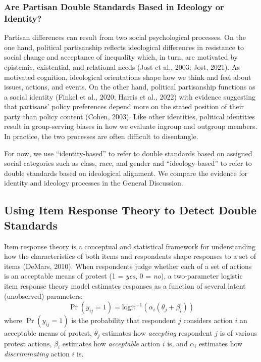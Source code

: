 \documentclass[12pt, letterpaper]{article}
\begin{document}
\hypertarget{are-partisan-double-standards-based-in-ideology-or-identity}{%
\subsubsection{Are Partisan Double Standards Based in Ideology or
Identity?}\label{are-partisan-double-standards-based-in-ideology-or-identity}}

Partisan differences can result from two social psychological processes.
On the one hand, political partisanship reflects ideological differences
in resistance to social change and acceptance of inequality which, in
turn, are motivated by epistemic, existential, and relational needs
(Jost et al., 2003; Jost, 2021). As motivated cognition, ideological
orientations shape how we think and feel about issues, actions, and
events. On the other hand, political partisanship functions as a social
identity (Finkel et al., 2020; Harris et al., 2022) with evidence
suggesting that partisans' policy preferences depend more on the stated
position of their party than policy content (Cohen, 2003). Like other
identities, political identities result in group-serving biases in how
we evaluate ingroup and outgroup members. In practice, the two processes
are often difficult to disentangle.

For now, we use ``identity-based'' to refer to double standards based on
assigned social categories such as class, race, and gender and
``ideology-based'' to refer to double standards based on ideological
alignment. We compare the evidence for identity and ideology processes
in the General Discussion.

\hypertarget{using-item-response-theory-to-detect-double-standards}{%
\subsection{Using Item Response Theory to Detect Double
Standards}\label{using-item-response-theory-to-detect-double-standards}}

Item response theory is a conceptual and statistical framework for
understanding how the characteristics of both items and respondents
shape responses to a set of items (DeMars, 2010). When respondents judge
whether each of a set of actions is an acceptable means of protest (1 =
\emph{yes}, 0 = \emph{no}), a two-parameter logistic item response
theory model estimates responses as a function of several latent
(unobserved) parameters:
\[ \Pr ( y_\textit{ij} = 1 ) = \text{logit}^{-1} ( \alpha_i ( \theta_j + \beta_i ) ) \]
where \(\Pr ( y_\textit{ij} = 1 )\) is the probability that respondent
\(j\) considers action \(i\) an acceptable means of protest,
\(\theta_j\) estimates how \emph{accepting} respondent \(j\) is of
various protest actions, \(\beta_i\) estimates how \emph{acceptable}
action \(i\) is, and \(\alpha_i\) estimates how \emph{discriminating}
action \(i\) is.
\end{document}
